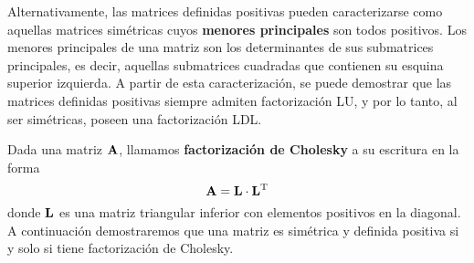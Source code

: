 Alternativamente, las matrices definidas positivas pueden caracterizarse como
aquellas matrices simétricas cuyos \textbf{menores
principales} son todos positivos. Los menores principales de una matriz
son los determinantes de sus submatrices principales, es decir,
aquellas submatrices cuadradas que contienen su esquina superior izquierda.
A partir de esta caracterización, se puede demostrar que las matrices
definidas positivas siempre admiten factorización LU, y por lo tanto,
al ser simétricas, poseen una factorización LDL.

Dada una matriz $\mathbf{A}$, llamamos \textbf{factorización de Cholesky} a su
escritura en la forma
\[ \mathbf{A} = \mathbf{L} \cdot \mathbf{L}^{\mathrm{T}} \]
donde $\mathbf{L}$ es una matriz triangular inferior con elementos positivos
en la diagonal. A continuación demostraremos que una matriz es simétrica y
definida positiva si y solo si tiene factorización de Cholesky.

